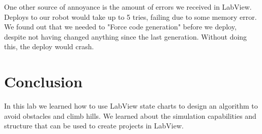 \documentclass[10pt,titlepage]{article}
\begin{document}
    One other source of annoyance is the amount of errors we received in LabView. Deploys to our robot would take up to 5 tries, failing due to some memory error. We found out that we needed to "Force code generation" before we deploy, despite not having changed anything since the last generation. Without doing this, the deploy would crash.

  \section{Conclusion}
    In this lab we learned how to use LabView state charts to design an algorithm to avoid obstacles and climb hills. We learned about the simulation capabilities and structure that can be used to create projects in LabView. 
\end{document}
